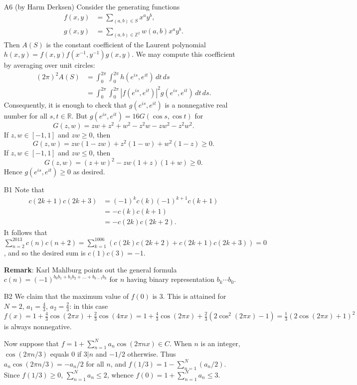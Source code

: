 \documentclass[amssymb,twocolumn,pra,10pt,aps]{revtex4-1}
\begin{document}
\begin{itemize}
\item[A6]
(by Harm Derksen)
Consider the generating functions
\begin{align*}
f(x,y) &= \sum_{(a,b) \in S} x^a y^b, \\
g(x,y) &= \sum_{(a,b) \in \mathbb{Z}^2} w(a,b) x^a y^b.
\end{align*}
Then $A(S)$ is the constant coefficient of the Laurent polynomial
$h(x,y) = f(x,y) f(x^{-1}, y^{-1}) g(x,y)$. We may compute this coefficient by averaging over unit circles:
\begin{align*}
(2 \pi)^2 A(S) &= \int_0^{2\pi} \int_0^{2\pi} h(e^{is}, e^{it})\,dt\,ds \\
&= \int_0^{2\pi} \int_0^{2\pi} \left| f(e^{is}, e^{it}) \right|^2 g(e^{is}, e^{it}) \,dt\,ds.
\end{align*}
Consequently, it is enough to check that $g(e^{is}, e^{it})$ is a nonnegative real number for all $s,t \in \mathbb{R}$. But
$g(e^{is}, e^{it}) = 16 G(\cos s,\cos t)$ for
\[
G(z,w) = zw + z^2 + w^2 - z^2 w - zw^2 - z^2w^2.
\]
If $z,w \in [-1,1]$ and $zw \geq 0$, then
\[
G(z,w) = zw(1-zw) + z^2(1-w) + w^2(1-z) \geq 0.
\]
If $z,w \in [-1,1]$ and $zw \leq 0$, then
\[
G(z,w) = (z+w)^2 - zw(1+z)(1+w) \geq 0.
\]
Hence $g(e^{is},e^{it}) \geq 0$ as desired.

\item[B1]
Note that 
\begin{align*}
c(2k+1)c(2k+3) &= (-1)^k c(k) (-1)^{k+1} c(k+1) \\
&= -c(k)c(k+1) \\ 
&= -c(2k)c(2k+2).
\end{align*}
It follows that $\sum_{n=2}^{2013} c(n)c(n+2) = \sum_{k=1}^{1006} (c(2k)c(2k+2)+c(2k+1)c(2k+3)) = 0$,
and so the desired sum is $c(1)c(3) = -1$. 

\textbf{Remark}: Karl Mahlburg points out the general formula
$c(n) = (-1)^{b_0 b_1 + b_1 b_2 + \dots + b_{k-1} b_k}$
for $n$ having binary representation $b_k \cdots b_0$.

\item[B2]
We claim that the maximum value of $f(0)$ is $3$. This is attained for
$N=2$, $a_1=\frac{4}{3}$, $a_2=\frac{2}{3}$: in this case $f(x) = 1+\frac{4}{3} \cos(2\pi x)+\frac{2}{3} \cos(4\pi x) =
1+\frac{4}{3} \cos(2\pi x)+\frac{2}{3}(2\cos^2(2\pi x)-1) = \frac{1}{3} (2\cos(2\pi x)+1)^2$ is always nonnegative.

Now suppose that $f = 1 + \sum_{n=1}^N a_n \cos(2\pi nx) \in C$. When $n$ is an integer, $\cos(2\pi n/3)$ equals $0$ if $3|n$ and $-1/2$ otherwise. Thus $a_n \cos(2\pi n/3) = -a_n/2$ for all $n$, and
$f(1/3) = 1-\sum_{n=1}^N (a_n/2)$. Since $f(1/3) \geq 0$, $\sum_{n=1}^N a_n \leq 2$, whence $f(0) = 1 + \sum_{n=1}^N a_n \leq 3$.



\end{itemize}
\end{document}
